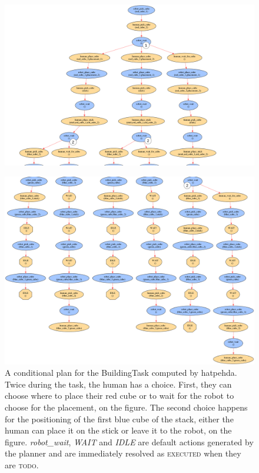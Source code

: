 \documentclass[a4paper,11pt,twoside]{StyleThese}
\begin{document}
\begin{landscape}
	\thispagestyle{example}
	\begin{figure}[!hp]
		\centering
		\includegraphics[scale=0.35]{figures/chapter2/plan_building.png}
	\end{figure}
\end{landscape}

\begin{landscape}
	\thispagestyle{example}
	\begin{figure}[!hp]
		\centering
		\includegraphics[scale=0.31]{figures/chapter2/plan_building2.png}
		\caption{A conditional plan for the BuildingTask computed by \acrshort{hatpehda}. Twice during the task, the human has a choice. First, they can choose where to place their red cube or to wait for the robot to choose for the placement,  on the figure. The second choice happens for the positioning of the first blue cube of the stack, either the human can place it on the stick or leave it to the robot,  on the figure. \textit{robot\_wait}, \textit{WAIT} and \textit{IDLE} are default actions generated by the planner and are immediately resolved as \textsc{executed} when they are \textsc{todo}. }
		\label{chap6:fig:plan_building2}
	\end{figure}
\end{landscape}
\restoregeometry
\end{document}
